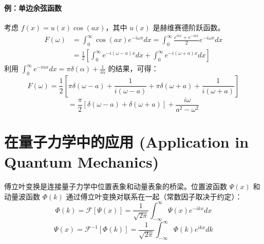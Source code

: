 \documentclass{article}
\begin{document}
	\paragraph{例：单边余弦函数}
	考虑 $f(x) = u(x)\cos(ax)$，其中 $u(x)$ 是赫维赛德阶跃函数。
	\begin{align*}
		F(\omega) &= \int_0^\infty \cos(ax) e^{-i\omega x} dx = \int_0^\infty \frac{e^{iax}+e^{-iax}}{2} e^{-i\omega x} dx \\
		&= \frac{1}{2} \left[ \int_0^\infty e^{-i(\omega-a)x}dx + \int_0^\infty e^{-i(\omega+a)x}dx \right]
	\end{align*}
	利用 $\int_0^\infty e^{-i\alpha x}dx = \pi\delta(\alpha) + \frac{1}{i\alpha}$ 的结果，可得：
	$$ 
	F(\omega) = \frac{1}{2} \left[ \pi\delta(\omega-a) + \frac{1}{i(\omega-a)} + \pi\delta(\omega+a) + \frac{1}{i(\omega+a)} \right] 
	$$
	$$ 
	= \frac{\pi}{2}[\delta(\omega-a)+\delta(\omega+a)] + \frac{i\omega}{a^2-\omega^2} 
	$$
	
	\section{在量子力学中的应用 (Application in Quantum Mechanics)}
	
	傅立叶变换是连接量子力学中位置表象和动量表象的桥梁。位置波函数 $\Psi(x)$ 和动量波函数 $\Phi(k)$ 通过傅立叶变换对联系在一起（常数因子取决于约定）：
	$$ 
	\Phi(k) = \mathcal{F}[\Psi(x)] = \frac{1}{\sqrt{2\pi}} \int_{-\infty}^{\infty} \Psi(x) e^{-ikx} dx 
	$$
	$$ 
	\Psi(x) = \mathcal{F}^{-1}[\Phi(k)] = \frac{1}{\sqrt{2\pi}} \int_{-\infty}^{\infty} \Phi(k) e^{ikx} dk 
	$$
	
\end{document}
